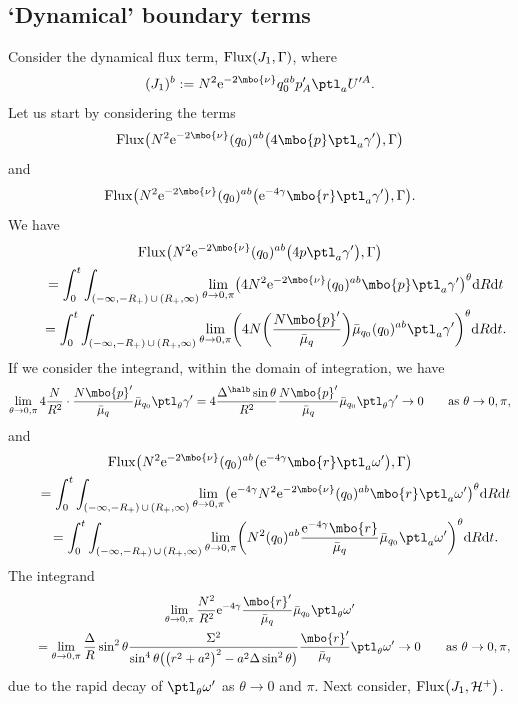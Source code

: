 \subsection*{`Dynamical' boundary terms}
Consider the dynamical flux term, ${\rm Flux} (J_1, \Gamma)$, where
\[
(J_1)^b := N^2 {\rm e}^{-2 \mbo{\nu}} q^{ab}_0 p'_A \ptl_a U'^A.
\]
Let us start by considering the terms
\[
{\rm Flux} \bigl(N^2 {\rm e}^{-2 \mbo{\nu}} (q_0)^{ab} \bigl(4 \mbo{p} \ptl_a \gamma' \bigr), \Gamma\bigr)
\]
 and
 \[
 {\rm Flux} \bigl(N^2 {\rm e}^{-2 \mbo{\nu}} (q_0)^{ab} \bigl({\rm e}^{-4 \gamma} \mbo{r} \ptl_a \gamma' \bigr), \Gamma\bigr).
 \]
We have
\begin{gather*}
{\rm Flux} \bigl(N^2 {\rm e}^{-2 \mbo{\nu}} (q_0)^{ab} \bigl(4p \ptl_a \gamma' \bigr), \Gamma\bigr) \\
\qquad{} = \int^t_0 \int_{ (-\infty, -R_+) \, \cup\, (R_+, \infty) } \lim_{\theta \to 0, \pi} \bigl(4 N^2 {\rm e}^{-2 \mbo{\nu}} (q_0)^{ab} \mbo{p} \ptl_a \gamma'\bigr)^\theta {\rm d}R {\rm d}t \notag\\
\qquad{}= \int^t_0 \int_{ (-\infty, -R_+) \, \cup\, (R_+, \infty) } \lim_{\theta \to 0, \pi} \biggl(4 N \biggl(\frac{ N\mbo{p}'}{\bar{\mu}_q} \biggr) \bar{\mu}_{q_0} (q_0)^{ab} \ptl_a \gamma' \biggr)^\theta {\rm d}R {\rm d}t. \notag
 \end{gather*}
If we consider the integrand, within the domain of integration, we have
 \begin{gather*}
 \lim_{\theta \to 0, \pi}4 \frac{N}{R^2} \cdot \frac{N \mbo{p}'}{\bar{\mu}_q} \bar{\mu}_{q_0} \ptl_\theta \gamma' = 4 \frac{\Delta^\halb \sin \theta}{R^2} \frac{N \mbo{p}'}{\bar{\mu}_q} \bar{\mu}_{q_0} \ptl_\theta \gamma'
 \to 0 \qquad \text{as} \ \theta \to 0, \pi,
\end{gather*}
and
\begin{gather*}
 {\rm Flux} \bigl(N^2 {\rm e}^{-2 \mbo{\nu}} (q_0)^{ab} \bigl({\rm e}^{-4 \gamma} \mbo{r} \ptl_a \omega' \bigr), \Gamma\bigr) \\
 \qquad{}= \int^t_0 \int_{ (-\infty, -R_+) \, \cup\, (R_+, \infty) } \lim_{\theta \to 0, \pi} \bigl( {\rm e}^{-4\gamma } N^2 {\rm e}^{-2 \mbo{\nu}} (q_0)^{ab} \mbo{r} \ptl_a \omega' \bigr)^\theta {\rm d}R {\rm d}t \notag\\
 \qquad{}= \int^t_0 \int_{ (-\infty, -R_+) \, \cup\, (R_+, \infty) } \lim_{\theta \to 0, \pi} \biggl( N^2 (q_0)^{ab} \frac{{\rm e}^{-4\gamma }\mbo{r}}{\bar{\mu}_q} \bar{\mu}_{q_0}\ptl_a \omega' \biggr)^\theta {\rm d}R {\rm d}t.
 \end{gather*}
The integrand
\begin{gather*}
 \lim_{\theta \to 0, \pi} \frac{N^2}{R^2} {\rm e}^{-4\gamma} \frac{\mbo{r}'}{\bar{\mu}_q} \bar{\mu}_{q_0} \ptl_\theta \omega' \notag\\
 \qquad{}= \lim_{\theta \to 0, \pi} \frac{\Delta}{R} \sin^2 \theta\frac{\Sigma^2}{\sin^4 \theta \bigl(\bigl(r^2+a^2\bigr)^2 -a^2 \Delta \sin^2 \theta\bigr)} \frac{\mbo{r}'}{\bar{\mu}_q} \ptl_\theta \omega'
 \to 0 \qquad \text{as} \ \theta \to 0, \pi,
\end{gather*}
due to the rapid decay of $\ptl_\theta \omega'$ as $\theta \to 0$ and $\pi$.
Next consider, ${\rm Flux} \bigl(J_1, \mathcal{H}^+\bigr)$.

